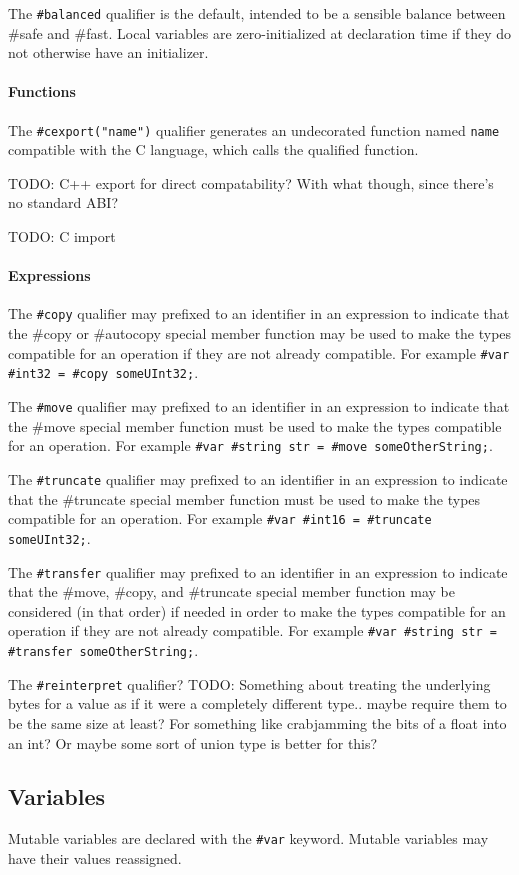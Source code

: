 \documentclass{article}
\newcommand{\code}[1]{\colorbox{light-gray}{\texttt{#1}}}
\newcommand{\breakingparagraph}[1]{\paragraph{#1}\mbox{}\medbreak}
\begin{document}
The \code{\#balanced} qualifier is the default, intended to be a sensible balance between \#safe and \#fast.  Local variables are zero-initialized at declaration time if they do not otherwise have an initializer.

\breakingparagraph{Functions}

The \code{\#cexport("name")} qualifier generates an undecorated function named \code{name} compatible with the C language, which calls the qualified function.

TODO: C++ export for direct compatability?  With what though, since there's no standard ABI?

TODO: C import

\breakingparagraph{Expressions}

The \code{\#copy} qualifier may prefixed to an identifier in an expression to indicate that the \#copy or \#autocopy special member function may be used to make the types compatible for an operation if they are not already compatible.  For example \code{\#var \#int32 = \#copy someUInt32;}.

The \code{\#move} qualifier may prefixed to an identifier in an expression to indicate that the \#move special member function must be used to make the types compatible for an operation.  For example \code{\#var \#string str = \#move someOtherString;}.

The \code{\#truncate} qualifier may prefixed to an identifier in an expression to indicate that the \#truncate special member function must be used to make the types compatible for an operation.  For example \code{\#var \#int16 = \#truncate someUInt32;}.

The \code{\#transfer} qualifier may prefixed to an identifier in an expression to indicate that the \#move, \#copy, and \#truncate special member function may be considered (in that order) if needed in order to make the types compatible for an operation if they are not already compatible.  For example \code{\#var \#string str = \#transfer someOtherString;}.

The \code{\#reinterpret} qualifier? TODO: Something about treating the underlying bytes for a value as if it were a completely different type.. maybe require them to be the same size at least?  For something like crabjamming the bits of a float into an int?  Or maybe some sort of union type is better for this?

\subsection{Variables}
Mutable variables are declared with the \code{\#var} keyword.  Mutable variables may have their values reassigned.
\end{document}
